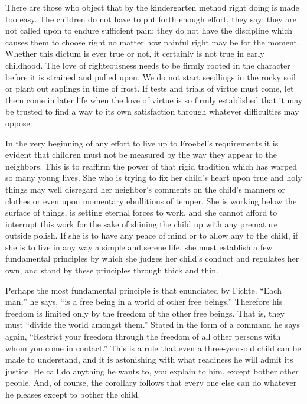 \begin{linenumbers}
\indent There are those who object that by the kindergarten method right doing is made too easy. The children do not have to put forth enough effort, they say; they are not called upon to endure sufficient pain; they do not have the discipline which causes them to choose right no matter how painful right may be for the moment. Whether this dictum is ever true or not, it certainly is not true in early childhood. The love of righteousness needs to be firmly rooted in the character before it is strained and pulled upon. We do not start seedlings in the rocky soil or plant out saplings in time of frost. If tests and trials of virtue must come, let them come in later life when the love of virtue is so firmly established that it may be trusted to find a way to its own satisfaction through whatever difficulties may oppose.

\indent In the very beginning of any effort to live up to Froebel's requirements it is evident that children must not be measured by the way they appear to the neighbors. This is to reaffirm the power of that rigid tradition which has warped so many young lives. She who is trying to fix her child's heart upon true and holy things may well disregard her neighbor's comments on the child's manners or clothes or even upon momentary ebullitions of temper. She is working below the surface of things, is setting eternal forces to work, and she cannot afford to interrupt this work for the sake of shining the child up with any premature outside polish. If she is to have any peace of mind or to allow any to the child, if she is to live in any way a simple and serene life, she must establish a few fundamental principles by which she judges her child's conduct and regulates her own, and stand by these principles through thick and thin.

\indent Perhaps the most fundamental principle is that enunciated by Fichte. ``Each man,'' he says, ``is a free being in a world of other free beings.'' Therefore his freedom is limited only by the freedom of the other free beings. That is, they must ``divide the world amongst them.'' Stated in the form of a command he says again, ``Restrict your freedom through the freedom of all other persons with whom you come in contact.'' This is a rule that even a three-year-old child can be made to understand, and it is astonishing with what readiness he will admit its justice. He call do anything he wants to, you explain to him, except bother other people. And, of course, the corollary follows that every one else can do whatever he pleases except to bother the child.

\end{linenumbers}

